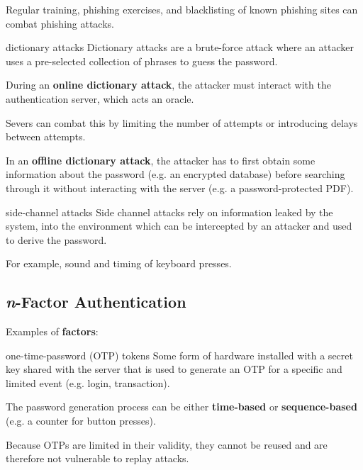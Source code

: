Regular training, phishing exercises, and blacklisting of known phishing sites can combat phishing attacks.

\begin{defn}{dictionary attacks}
    Dictionary attacks are a brute-force attack where an attacker uses a pre-selected collection of phrases to guess the password.

    During an \textbf{online dictionary attack}, the attacker must interact with the authentication server, which acts an oracle.

    Severs can combat this by limiting the number of attempts or introducing delays between attempts.

    In an \textbf{offline dictionary attack}, the attacker has to first obtain some information about the password (e.g. an encrypted database) before searching through it without interacting with the server (e.g. a password-protected PDF).
\end{defn}

\begin{defn}{side-channel attacks}
    Side channel attacks rely on information leaked by the system, into the environment which can be intercepted by an attacker and used to derive the password.

    For example, sound and timing of keyboard presses.
\end{defn}

\subsection{\textit{n}-Factor Authentication}
Examples of \textbf{factors}:
\begin{enumerate}
\end{enumerate}

\begin{defn}{one-time-password (OTP) tokens}
    Some form of hardware installed with a secret key shared with the server that is used to generate an OTP for a specific and limited event (e.g. login, transaction).
    
    The password generation process can be either \textbf{time-based} or \textbf{sequence-based} (e.g. a counter for button presses).
\end{defn}

Because OTPs are limited in their validity, they cannot be reused and are therefore not vulnerable to replay attacks.

